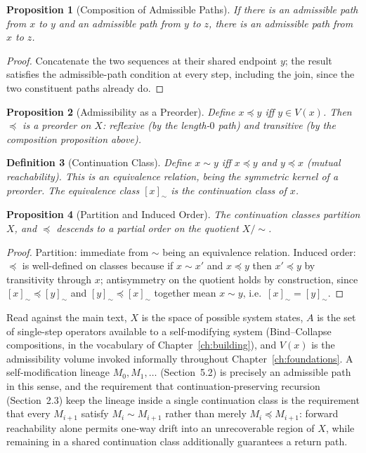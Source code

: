 \documentclass[11pt]{book}
\newtheorem{definition}{Definition}[chapter]
\newtheorem{proposition}[definition]{Proposition}
\begin{document}
\begin{proposition}[Composition of Admissible Paths]
If there is an admissible path from $x$ to $y$ and an admissible path from $y$ to $z$, there is an admissible path from $x$ to $z$.
\end{proposition}
\begin{proof}
Concatenate the two sequences at their shared endpoint $y$; the result satisfies the admissible-path condition at every step, including the join, since the two constituent paths already do.
\end{proof}

\begin{proposition}[Admissibility as a Preorder]
Define $x\preceq y$ iff $y\in V(x)$. Then $\preceq$ is a preorder on $X$: reflexive (by the length-$0$ path) and transitive (by the composition proposition above).
\end{proposition}

\begin{definition}[Continuation Class]
Define $x\sim y$ iff $x\preceq y$ and $y\preceq x$ (mutual reachability). This is an equivalence relation, being the symmetric kernel of a preorder. The equivalence class $[x]_\sim$ is the \emph{continuation class} of $x$.
\end{definition}

\begin{proposition}[Partition and Induced Order]
The continuation classes partition $X$, and $\preceq$ descends to a partial order on the quotient $X/{\sim}$.
\end{proposition}
\begin{proof}
Partition: immediate from $\sim$ being an equivalence relation. Induced order: $\preceq$ is well-defined on classes because if $x\sim x'$ and $x\preceq y$ then $x'\preceq y$ by transitivity through $x$; antisymmetry on the quotient holds by construction, since $[x]_\sim \preceq [y]_\sim$ and $[y]_\sim\preceq[x]_\sim$ together mean $x\sim y$, i.e.\ $[x]_\sim = [y]_\sim$.
\end{proof}

Read against the main text, $X$ is the space of possible system states, $A$ is the set of single-step operators available to a self-modifying system (Bind--Collapse compositions, in the vocabulary of Chapter~\ref{ch:building}), and $V(x)$ is the admissibility volume invoked informally throughout Chapter~\ref{ch:foundations}. A self-modification lineage $M_0,M_1,\dots$ (Section~5.2) is precisely an admissible path in this sense, and the requirement that continuation-preserving recursion (Section~2.3) keep the lineage inside a single continuation class is the requirement that every $M_{i+1}$ satisfy $M_i\sim M_{i+1}$ rather than merely $M_i\preceq M_{i+1}$: forward reachability alone permits one-way drift into an unrecoverable region of $X$, while remaining in a shared continuation class additionally guarantees a return path.
\end{document}
